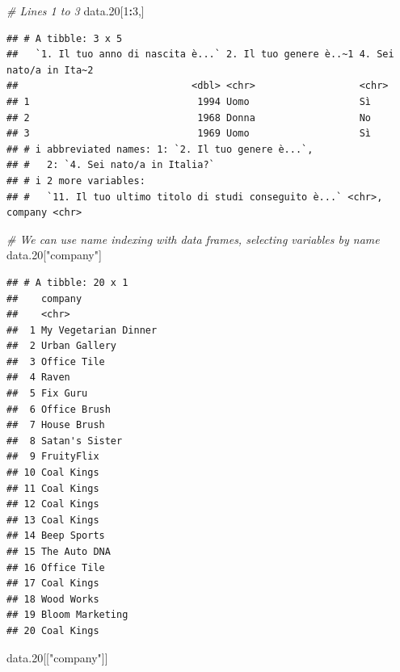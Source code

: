 \documentclass[
]{book}
\newenvironment{Shaded}{\begin{snugshade}}{\end{snugshade}}
\newcommand{\CommentTok}[1]{\textcolor[rgb]{0.56,0.35,0.01}{\textit{#1}}}
\newcommand{\DecValTok}[1]{\textcolor[rgb]{0.00,0.00,0.81}{#1}}
\newcommand{\FloatTok}[1]{\textcolor[rgb]{0.00,0.00,0.81}{#1}}
\newcommand{\NormalTok}[1]{#1}
\newcommand{\SpecialCharTok}[1]{\textcolor[rgb]{0.81,0.36,0.00}{\textbf{#1}}}
\newcommand{\StringTok}[1]{\textcolor[rgb]{0.31,0.60,0.02}{#1}}
\begin{document}
\begin{Shaded}
\begin{Highlighting}[]
\CommentTok{\# Lines 1 to 3}
\NormalTok{data}\FloatTok{.20}\NormalTok{[}\DecValTok{1}\SpecialCharTok{:}\DecValTok{3}\NormalTok{,]}
\end{Highlighting}
\end{Shaded}

\begin{verbatim}
## # A tibble: 3 x 5
##   `1. Il tuo anno di nascita è...` 2. Il tuo genere è..~1 4. Sei nato/a in Ita~2
##                              <dbl> <chr>                  <chr>                 
## 1                             1994 Uomo                   Sì                    
## 2                             1968 Donna                  No                    
## 3                             1969 Uomo                   Sì                    
## # i abbreviated names: 1: `2. Il tuo genere è...`,
## #   2: `4. Sei nato/a in Italia?`
## # i 2 more variables:
## #   `11. Il tuo ultimo titolo di studi conseguito è...` <chr>, company <chr>
\end{verbatim}

\begin{Shaded}
\begin{Highlighting}[]
\CommentTok{\# We can use name indexing with data frames, selecting variables by name}
\NormalTok{data}\FloatTok{.20}\NormalTok{[}\StringTok{"company"}\NormalTok{]}
\end{Highlighting}
\end{Shaded}

\begin{verbatim}
## # A tibble: 20 x 1
##    company             
##    <chr>               
##  1 My Vegetarian Dinner
##  2 Urban Gallery       
##  3 Office Tile         
##  4 Raven               
##  5 Fix Guru            
##  6 Office Brush        
##  7 House Brush         
##  8 Satan's Sister      
##  9 FruityFlix          
## 10 Coal Kings          
## 11 Coal Kings          
## 12 Coal Kings          
## 13 Coal Kings          
## 14 Beep Sports         
## 15 The Auto DNA        
## 16 Office Tile         
## 17 Coal Kings          
## 18 Wood Works          
## 19 Bloom Marketing     
## 20 Coal Kings
\end{verbatim}

\begin{Shaded}
\begin{Highlighting}[]
\NormalTok{data}\FloatTok{.20}\NormalTok{[[}\StringTok{"company"}\NormalTok{]]}
\end{Highlighting}
\end{Shaded}
\end{document}
